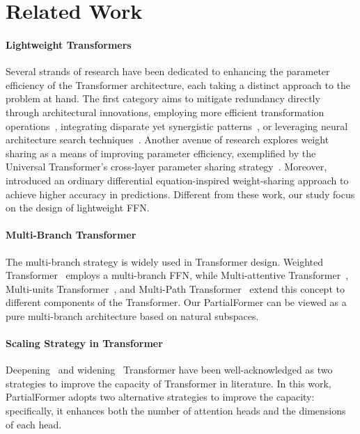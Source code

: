 \documentclass[11pt]{article}
\begin{document}
\section{Related Work}
\paragraph{Lightweight Transformers}
Several strands of research have been dedicated to enhancing the parameter efficiency of the Transformer architecture, each taking a distinct approach to the problem at hand. The first category aims to mitigate redundancy directly through architectural innovations, employing more efficient transformation operations~\cite{Mehta2019DeFINEDF,Mehta2021Delight}, integrating disparate yet synergistic patterns~\cite{Wu2020Lite}, or leveraging neural architecture search techniques~\cite{So2019EvolvedTransformer}.
Another avenue of research explores weight sharing as a means of improving parameter efficiency, exemplified by the Universal Transformer's cross-layer parameter sharing strategy~\cite{Dehghani2019UniversalTransformer, reid-etal-2021-subformer-exploring}. Moreover, \citet{li-etal-2022-ode} introduced an ordinary differential equation-inspired weight-sharing approach to achieve higher accuracy in predictions. Different from these work, our study focus on the design of lightweight FFN.




\paragraph{Multi-Branch Transformer}


The multi-branch strategy is widely used in Transformer design. Weighted Transformer~\cite{Ahmed2017WeightedTransformer} employs a multi-branch FFN, while Multi-attentive Transformer~\cite{Fan2020MultibranchAT}, Multi-units Transformer~\cite{yan-etal-2020-multi}, and Multi-Path Transformer~\cite{lin-etal-2022-multi-path} extend this concept to different components of the Transformer. Our PartialFormer can be viewed as a pure multi-branch architecture based on natural subspaces.

\paragraph{Scaling Strategy in Transformer}
Deepening~\cite{bapna-etal-2018-training, wang-etal-2019-learning-deep} and widening~\cite{Vaswani2017transformer, wu2021r} Transformer have been well-acknowledged as two strategies to improve the capacity of Transformer in literature. In this work, PartialFormer adopts two alternative strategies to improve the capacity: specifically, it enhances both the number of attention heads and the dimensions of each head.
\end{document}
